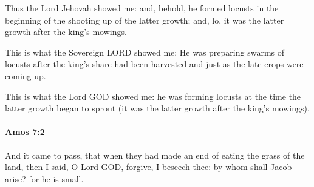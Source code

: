 			\begin{versebox}
					\item[BHS] 
					\item[LXX] 
					\item[ASV] Thus the Lord Jehovah showed me: and, behold, he formed locusts in the beginning of the shooting up of the latter growth; and, lo, it was the latter growth after the king's mowings.
					\item[NIV] This is what the Sovereign LORD showed me: He was preparing swarms of locusts after the king’s share had been harvested and just as the late crops were coming up.
					\item[NRSV] This is what the Lord GOD showed me: he was forming locusts at the time the latter growth began to sprout (it was the latter growth after the king’s mowings).
			\end{versebox}

		\paragraph{Amos 7:2} %
			\label{AMOS-7-2}

			And it came to pass, that when they had made an end of eating the grass of the land, then I said, O Lord GOD, forgive, I beseech thee: by whom shall Jacob arise? for he is small.


